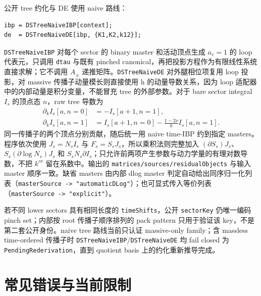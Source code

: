 ﻿\documentclass[a4paper,11pt]{article}
\begin{document}
公开 tree 约化与 DE 使用 naive 路线：
\begin{verbatim}
ibp = DSTreeNaiveIBP[context];
de  = DSTreeNaiveDE[ibp, {K1,K2,k12}];
\end{verbatim}
\texttt{DSTreeNaiveIBP} 对每个 sector 的 binary master 和活动顶点生成 $a_v=1$ 的 loop 代表元，只调用 \texttt{dtau} 与既有 pinched canonical，再把投影方程作为有限线性系统直接求解；它不调用 $A_\pm$ 递推矩阵。\texttt{DSTreeNaiveDE} 对外腿相位项复用 loop 投影，对 massive 传播子动量模长则直接使用 h 的动量导数关系，因为 loop 适配器中的内部动量是积分变量，不能冒充 tree 的外部参数。对于 bare sector integral $I_s$ 的顶点态 $n$，raw tree 导数为
\begin{align}
 \partial_k I_s[a,n=0]&=-I_s[a+1,n=1],\\
 \partial_k I_s[a,n=1]&=I_s[a+1,n=0]-\frac{1-2\nu}{k}I_s[a,n=1].
\end{align}
同一传播子的两个顶点分别贡献，随后统一用 naive time-IBP 约到指定 masters。程序依次使用 $J_s=N_sI_s$ 与 $F_s=S_sJ_s$，所以乘积法则完整加入 $(\partial S_s)J_s$、$S_s(\partial\log N_s)J_s$ 和 $S_sN_s\partial I_s$；只允许前两项产生参数与动力学量的有理对数导数，不把 $k^{c\nu}$ 留在系数中。输出的 \texttt{matrices/sources/residualObjects} 与输入 master 顺序一致。缺省 masters 由内部 dlog master 判定自动给出同序归一化列表（\texttt{masterSource -> "automaticDLog"}）；也可显式传入等价列表（\texttt{masterSource -> "explicit"}）。

若不同 lower sectors 具有相同长度的 \texttt{timeShifts}，公开 \texttt{sectorKey} 仍唯一编码 pinch set；内部按 root 传播子顺序排列的 pack pattern 只用于验证该 key，不是第二套公开身份。naive tree 路线当前只认证 massive-only family；含 massless time-ordered 传播子时 \texttt{DSTreeNaiveIBP}/\texttt{DSTreeNaiveDE} 均 fail closed 为 \texttt{PendingRederivation}，直到 quotient basis 上的约化重新推导完成。

\section{常见错误与当前限制}
\end{document}
